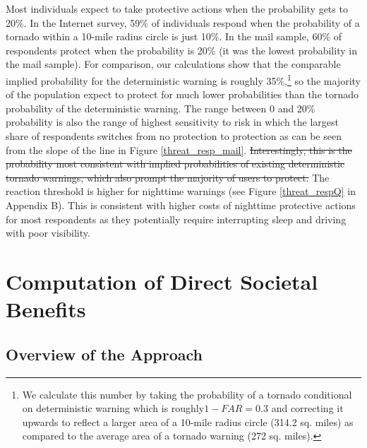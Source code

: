 \documentclass{ametsocV6.1}
\newcommand{\add}[1]{{\color{red}#1}}
\begin{document}
Most individuals expect to take protective actions when the probability gets to 20\%.  \add{In the Internet survey, 59\% of individuals respond when the probability of a tornado within a 10-mile radius  circle is just 10\%. In the mail sample, 60\% of respondents protect when the probability is 20\% (it was the lowest probability in the mail sample). For comparison, our calculations show that the comparable implied probability for the deterministic warning is roughly 35\%,\footnote{We calculate this number by taking the probability of a tornado conditional on deterministic warning which is roughly$1-FAR=0.3$ \citep{simmons_economic_2013} and correcting it upwards to reflect a larger area of a 10-mile radius circle (314.2 sq. miles) as compared to the average area of a tornado warning (272 sq. miles).}   so the majority of the population expect to protect for much lower probabilities than the tornado probability of the deterministic warning.} The range between 0 and 20\% probability is also the range of highest sensitivity to risk in which the largest share of respondents switches from no protection to protection as can be seen from the slope of the line in Figure \ref{threat_resp_mail}. \sout{ Interestingly, this is the probability most consistent with implied probabilities of existing deterministic tornado warnings, which also prompt the majority of users to protect.} The reaction threshold is higher for nighttime warnings (see Figure \ref{threat_respQ} in Appendix B). This is consistent with higher costs of nighttime protective actions for most respondents as they potentially require interrupting sleep and driving with poor visibility.




\vspace{20pt}
\section{Computation of Direct Societal Benefits}
\vspace{10pt}
\subsection{Overview of the Approach} 
\end{document}
